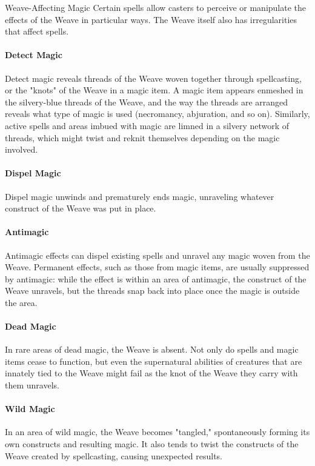 \documentclass[10pt,a4paper,twoside,twocolumn,openany,bg=print,nodeprecatedcode]{dndbook}
\begin{document}
\begin{DndComment}{Weave-Affecting Magic}
Certain spells allow casters to perceive or manipulate the effects of the Weave in particular ways. The Weave itself also has irregularities that affect spells.
\paragraph{Detect Magic}
Detect magic reveals threads of the Weave woven together through spellcasting, or the "knots" of the Weave in a magic item. A magic item appears enmeshed in the silvery-blue threads of the Weave, and the way the threads are arranged reveals what type of magic is used (necromancy, abjuration, and so on). Similarly, active spells and areas imbued with magic are limned in a silvery network of threads, which might twist and reknit themselves depending on the magic involved.
\paragraph{Dispel Magic}
Dispel magic unwinds and prematurely ends magic, unraveling whatever construct of the Weave was put in place.
\paragraph{Antimagic}
Antimagic effects can dispel existing spells and unravel any magic woven from the Weave. Permanent effects, such as those from magic items, are usually suppressed by antimagic: while the effect is within an area of antimagic, the construct of the Weave unravels, but the threads snap back into place once the magic is outside the area.
\paragraph{Dead Magic}
In rare areas of dead magic, the Weave is absent. Not only do spells and magic items cease to function, but even the supernatural abilities of creatures that are innately tied to the Weave might fail as the knot of the Weave they carry with them unravels.
\paragraph{Wild Magic}
In an area of wild magic, the Weave becomes "tangled," spontaneously forming its own constructs and resulting magic. It also tends to twist the constructs of the Weave created by spellcasting, causing unexpected results.
\end{DndComment}
\end{document}
